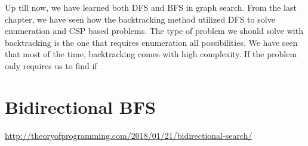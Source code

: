 \documentclass[../main.tex]{subfiles}
\begin{document}
Up till now, we have learned both DFS and BFS in graph search. From the last chapter, we have seen how the backtracking method utilized DFS to  solve enumeration and CSP based problems. The type of problem we should solve with backtracking is the one that requires enumeration all possibilities. We have seen that most of the time, backtracking comes with high complexity. If the problem only requires us to find if 
\section{Bidirectional BFS}
\url{http://theoryofprogramming.com/2018/01/21/bidirectional-search/}
\section{} 
\end{document}
